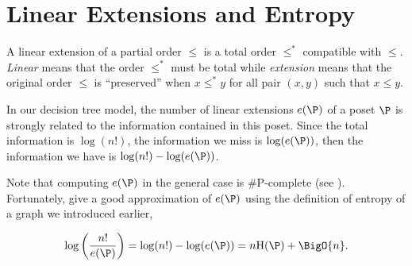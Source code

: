\section{Linear Extensions and Entropy}

A linear extension of a partial order $\leq$ is a total order $\leq^*$
compatible with $\leq$. \emph{Linear} means that the order $\leq^*$ must be
total while \emph{extension} means that the original order $\leq$ is
``preserved'' \ie when \(x \leq^* y\) for all pair \((x,y)\) such that \(x
\leq y\).

In our decision tree model, the number of linear extensions $e(\P)$ of a poset
$\P$ is strongly related to the information contained in this poset. Since the
total information is $\log(n!)$, the information we miss is $\log(e(\P))$, then
the information we have is $\log(n!) - \log(e(\P))$.


Note that computing $e(\P)$ in the general case is \#P-complete
(see \citet*{brightwell1991counting}). Fortunately, \citet*{kahn:1995} give a good
approximation of $e(\P)$ using the definition of entropy of a graph we
introduced earlier,

\begin{equation}
\log\left(\frac{n!}{e(\P)}\right) = \log(n!) - \log(e(\P)) = n \text{H}(\P) +
\BigO{n}.
\label{eq:khankim1}
\end{equation}
